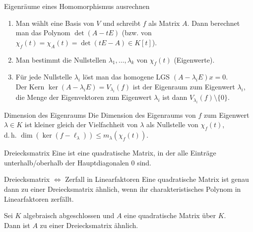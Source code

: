 \begin{Prozedur}{Eigenräume eines Homomorphismus ausrechnen}
    \begin{enumerate}
        \item Man wählt eine Basis von $V$ und schreibt $f$ als Matrix $A$.
        Dann berechnet man das Polynom $\det(A - tE)$ (bzw. von
        $\chi_f(t) = \chi_A(t) = \det(tE - A) \in K[t]$).

        \item Man bestimmt die Nullstellen $\lambda_1, \ldots, \lambda_k$ von
        $\chi_f(t)$ (Eigenwerte).

        \item Für jede Nullstelle $\lambda_i$ löst man das homogene LGS
        $(A - \lambda_i E) x = 0$. \\
        Der Kern $\ker (A - \lambda_i E) = V_{\lambda_i}(f)$ ist der Eigenraum
        zum Eigenwert $\lambda_i$, die Menge der Eigenvektoren zum Eigenwert
        $\lambda_i$ ist dann $V_{\lambda_i}(f) \setminus \{0\}$.
    \end{enumerate}
\end{Prozedur}

\begin{Satz}{Dimension des Eigenraums}
    Die Dimension des Eigenraums von $f$ zum Eigenwert $\lambda \in K$ ist
    kleiner gleich der Vielfachheit von $\lambda$ als Nullstelle von
    $\chi_f(t)$, \\
    d.\,h. $\dim(\ker(f - \ell_\lambda)) \le m_\lambda(\chi_f(t))$.
\end{Satz}

\begin{Def}{Dreiecksmatrix}
    Eine  ist eine
    quadratische Matrix,
    in der alle Einträge unterhalb/oberhalb der Hauptdiagonalen $0$ sind.
\end{Def}

\begin{Satz}{Dreiecksmatrix $\Leftrightarrow$ Zerfall in Linearfaktoren}
    Eine quadratische Matrix ist genau dann zu einer Dreiecksmatrix ähnlich,
    wenn ihr charakteristisches Polynom in Linearfaktoren zerfällt.
\end{Satz}

\begin{Kor}
    Sei $K$ algebraisch abgeschlossen und $A$ eine quadratische Matrix über
    $K$. \\
    Dann ist $A$ zu einer Dreiecksmatrix ähnlich.
\end{Kor}

